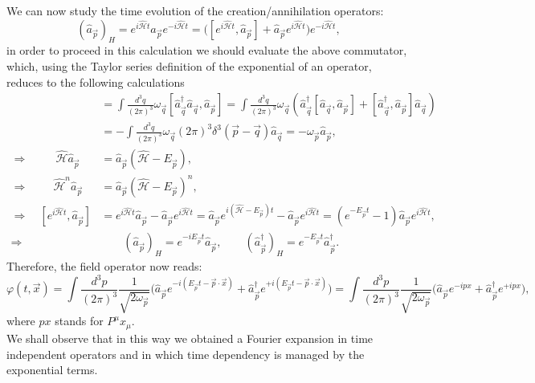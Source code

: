 We can now study the time evolution of the creation/annihilation operators:
\begin{equation*}
    (\hat{a}_{\vec p})_H=e^{i\hat{\mathcal{H}} t}\hat{a}_{\vec p}e^{-i\hat{\mathcal{H}} t}=\big([e^{i\hat{\mathcal{H}} t},\hat{a}_{\vec p}]+\hat{a}_{\vec p}e^{i\hat{\mathcal{H}} t}\big)e^{-i\hat{\mathcal{H}} t},
\end{equation*}
in order to proceed in this calculation we should evaluate the above commutator, which, using the Taylor series definition of the exponential of an operator, reduces to the following calculations
\begin{align*}
   [\hat{\mathcal{H}},\hat{a}_{\vec p}]&=\int\frac{d^3q}{(2\pi)^3}\omega_{\vec{q}}[\hat{a}^\dagger_{\vec{q}}\hat{a}_{\vec{q}},\hat{a}_{\vec p}]=\int\frac{d^3q}{(2\pi)^3}\omega_{\vec{q}}(\hat{a}^\dagger_{\vec{q}}[\hat{a}_{\vec{q}},\hat{a}_{\vec p}]+[\hat{a}^\dagger_{\vec{q}},\hat{a}_{\vec p}]\hat{a}_{\vec{q}})\\ &=-\int\frac{d^3q}{(2\pi)^3}\omega_{\vec{q}}(2\pi)^3\delta^3(\vec p-\vec q)\hat{a}_{\vec{q}}=-\omega_{\vec p}\hat{a}_{\vec p},\\
   \Rightarrow\qquad\ \ \hat{\mathcal{H} }\hat{a}_{\vec p}&=\hat{a}_{\vec p}(\hat{\mathcal{H} }-E_{\vec p}),\\
   \Rightarrow\qquad\ \hat{\mathcal{H} }^n\hat{a}_{\vec p}&=\hat{a}_{\vec p}(\hat{\mathcal{H} }-E_{\vec p})^{n},\\\Rightarrow\quad [e^{i\hat{\mathcal{H}} t},\hat{a}_{\vec p}]&=e^{i\hat{\mathcal{H} }t}\hat{a}_{\vec p}-\hat{a}_{\vec p}e^{i\hat{\mathcal{H} }t}=\hat{a}_{\vec p}e^{i(\hat{\mathcal{H} }-E_{\vec{p}})t}-\hat{a}_{\vec p}e^{i\hat{\mathcal{H} }t}=(e^{-E_{\vec p}t}-1)\hat{a}_{\vec p}e^{i\hat{\mathcal{H} }t},\\
   \Longrightarrow &\qquad(\hat{a}_{\vec p})_H =e^{-iE_{\vec{p}}t}\hat{a}_{\vec{p}},\qquad(\hat{a}^\dagger_{\vec p})_H=e^{-E_{\vec{p}}t}\hat{a}^\dagger_{\vec{p}}.
\end{align*}
Therefore, the field operator now reads:
\begin{equation*}
    \varphi(t,\vec x)=\int\frac{d^3p}{(2\pi)^3}\frac{1}{\sqrt{2\omega_{\vec p}}}\bigg(\hat{a}_{\vec p}e^{-i(E_{\vec p}t-\vec p\cdot\vec x)}+\hat{a}^\dagger_{\vec p}e^{+i(E_{\vec p}t-\vec p\cdot\vec x)}\bigg)=\int\frac{d^3p}{(2\pi)^3}\frac{1}{\sqrt{2\omega_{\vec p}}}\bigg(\hat{a}_{\vec p}e^{-ipx}+\hat{a}^\dagger_{\vec p}e^{+ipx}\bigg),
\end{equation*}
where $px$ stands for $P^\mu x_\mu$.\\We shall observe that in this way we obtained a Fourier expansion in time independent operators and in which time dependency is managed by the exponential terms.\\

